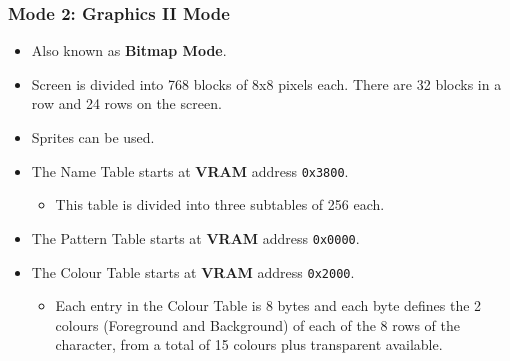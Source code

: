 \documentclass[a4paper,11pt]{article}
\begin{document}
        \subsubsection{Mode 2: \textbf{Graphics II Mode}}
        \begin{itemize}
            \item Also known as \textbf{Bitmap Mode}.
            \item Screen is divided into 768 blocks of 8x8 pixels each. There
            are 32 blocks in a row and 24 rows on the screen.
            \item Sprites can be used.
            \item The Name Table starts at \textbf{VRAM} address \texttt{0x3800}.
            \begin{itemize}
                \item This table is divided into three subtables of 256 each.
            \end{itemize}
            \item The Pattern Table starts at \textbf{VRAM} address \texttt{0x0000}.
            \item The Colour Table starts at \textbf{VRAM} address \texttt{0x2000}.
            \begin{itemize}
                \item Each entry in the Colour Table is 8 bytes and each byte
                    defines the 2 colours (Foreground and Background) of each 
                    of the 8 rows of the character, from a total of 15 colours
                    plus transparent available.
            \end{itemize}
        \end{itemize}

\end{document}
